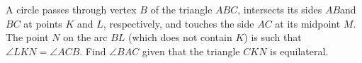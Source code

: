 A circle passes through vertex $B$ of the triangle $ABC$,  intersects its sides $ AB $and $BC$ at points $K$ and $L$,  respectively, and touches the side $ AC$ at its midpoint $M$. The point $N$ on the arc $BL$ (which does not contain $K$) is such that $\angle LKN = \angle ACB$. Find $\angle BAC $ given that the triangle $CKN$ is equilateral.